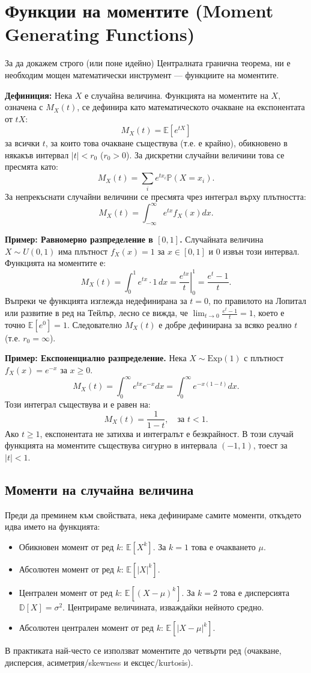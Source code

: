 \documentclass{article}
\begin{document}
\section{Функции на моментите (Moment Generating Functions)}

За да докажем строго (или поне идейно) Централната гранична теорема, ни е необходим мощен математически инструмент — функциите на моментите.

\textbf{Дефиниция:} Нека $X$ е случайна величина. Функцията на моментите на $X$, означена с $M_X(t)$, се дефинира като математическото очакване на експонентата от $tX$:
\[ M_X(t) = \mathbb{E}[e^{tX}] \]
за всички $t$, за които това очакване съществува (т.е. е крайно), обикновено в някакъв интервал $|t| < r_0$ ($r_0 > 0$). За дискретни случайни величини това се пресмята като:
\[ M_X(t) = \sum_{i} e^{t x_i} \mathbb{P}(X = x_i). \]
За непрекъснати случайни величини се пресмята чрез интеграл върху плътността:
\[ M_X(t) = \int_{-\infty}^{\infty} e^{tx} f_X(x) dx. \]

\textbf{Пример: Равномерно разпределение в $[0,1]$.}
Случайната величина $X \sim U(0,1)$ има плътност $f_X(x) = 1$ за $x \in [0,1]$ и 0 извън този интервал. Функцията на моментите е:
\[ M_X(t) = \int_0^1 e^{tx} \cdot 1 \, dx = \left. \frac{e^{tx}}{t} \right|_{0}^{1} = \frac{e^t - 1}{t}. \]
Въпреки че функцията изглежда недефинирана за $t=0$, по правилото на Лопитал или развитие в ред на Тейлър, лесно се вижда, че $\lim_{t \to 0} \frac{e^t - 1}{t} = 1$, което е точно $\mathbb{E}[e^0] = 1$. Следователно $M_X(t)$ е добре дефинирана за всяко реално $t$ (т.е. $r_0 = \infty$).

\textbf{Пример: Експоненциално разпределение.}
Нека $X \sim \text{Exp}(1)$ с плътност $f_X(x) = e^{-x}$ за $x \ge 0$.
\[ M_X(t) = \int_0^\infty e^{tx} e^{-x} dx = \int_0^\infty e^{-x(1-t)} dx. \]
Този интеграл съществува и е равен на:
\[ M_X(t) = \frac{1}{1-t}, \quad \text{за } t < 1. \]
Ако $t \ge 1$, експонентата не затихва и интегралът е безкрайност. В този случай функцията на моментите съществува сигурно в интервала $(-1, 1)$, тоест за $|t| < 1$.

\subsection{Моменти на случайна величина}
Преди да преминем към свойствата, нека дефинираме самите моменти, откъдето идва името на функцията:
\begin{itemize}
    \item Обикновен момент от ред $k$: $\mathbb{E}[X^k]$. За $k=1$ това е очакването $\mu$.
    \item Абсолютен момент от ред $k$: $\mathbb{E}[|X|^k]$.
    \item Централен момент от ред $k$: $\mathbb{E}[(X - \mu)^k]$. За $k=2$ това е дисперсията $\mathbb{D}[X] = \sigma^2$. Центрираме величината, изваждайки нейното средно.
    \item Абсолютен централен момент от ред $k$: $\mathbb{E}[|X - \mu|^k]$.
\end{itemize}
В практиката най-често се използват моментите до четвърти ред (очакване, дисперсия, асиметрия/skewness и ексцес/kurtosis).
\end{document}
